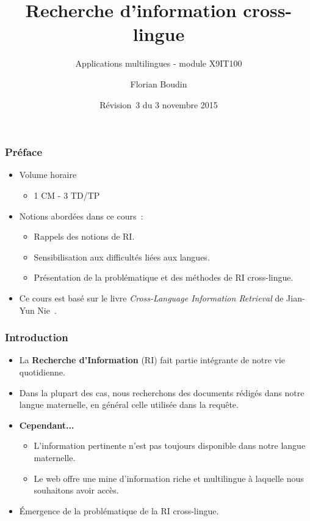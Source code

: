 \documentclass[11pt,aspectratio=43,dvipsnames,table]{beamer}
\title{Recherche d'information cross-lingue}
\subtitle{Applications multilingues - module X9IT100}
\author{Florian Boudin}
\institute{Département informatique, Université de Nantes}
\date[3 novembre 2015 / Rév.~3]{Révision~3 du 3 novembre 2015}
\begin{document}
\frame[plain]{\titlepage}


\begin{frame}
    \frametitle{Préface}
    \begin{itemize} \itemsep10pt
        \item Volume horaire
        \begin{itemize}
            \item 1 CM - 3 TD/TP
        \end{itemize}
        \item Notions abordées dans ce cours~:
        \begin{itemize}
            \item Rappels des notions de RI.
            \item Sensibilisation aux difficultés liées aux langues.
            \item Présentation de la problématique et des méthodes de RI 
                  cross-lingue.
        \end{itemize}
        \item Ce cours est basé sur le livre \textit{Cross-Language Information 
              Retrieval} de Jian-Yun Nie~\cite{DBLP:series/synthesis/2010Nie}.
    \end{itemize}
\end{frame}


\begin{frame}
    \frametitle{Introduction}
    \begin{itemize} \itemsep10pt
        \item La \textbf{Recherche d'Information} (RI) fait partie intégrante de
              notre vie quotidienne.
        \item Dans la plupart des cas, nous recherchons des documents rédigés 
              dans notre langue maternelle, en général celle utilisée dans la 
              requête.
        \item \textbf{Cependant...}
        \begin{itemize}
            \item L'information pertinente n'est pas toujours disponible dans 
                  notre langue maternelle.
            \item Le web offre une mine d'information riche et multilingue à 
                  laquelle nous souhaitons avoir accès.
        \end{itemize}
        \item \'Emergence de la problématique de la RI cross-lingue.
    \end{itemize}
\end{frame}
\end{document}
